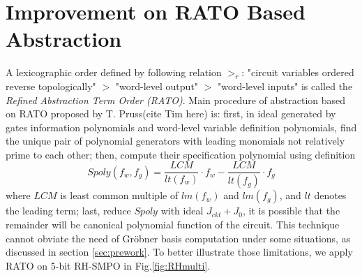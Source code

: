 \section{Improvement on RATO Based Abstraction}
A lexicographic order defined by following relation $>_{r}$: "circuit variables ordered reverse topologically" $>$ 
"word-level output" $>$ "word-level inputs" is called the \emph{Refined Abstraction Term Order (RATO)}. Main procedure
of abstraction based on RATO proposed by T. Pruss(cite Tim here)\cite{TimDAC} is: first, in ideal generated by
gates information polynomials and word-level variable definition polynomials, find the unique pair of polynomial
generators with leading monomials not relatively prime to each other; then, compute their specification polynomial
using definition 
$$Spoly(f_w,f_g) = \frac{LCM}{lt(f_w)}\cdot f_w - \frac{LCM}{lt(f_g)}\cdot f_g$$
where $LCM$ is least common multiple of $lm(f_w)$ and $lm(f_g)$, and $lt$ denotes the leading term;
last, reduce $Spoly$ with ideal $J_{ckt}+J_0$, it is possible that the remainder will be canonical polynomial
function of the circuit. This technique
cannot obviate the need of Gr\"obner basis computation under some situations, as discussed
in section \ref{sec:prework}. To better illustrate those limitations, we apply RATO on 5-bit RH-SMPO in Fig.\ref{fig:RHmulti}.

